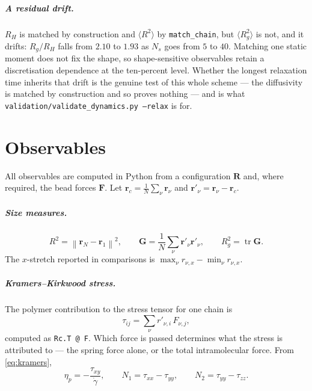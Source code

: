 \documentclass[11pt,a4paper]{report}
\newcommand{\R}{\bm{R}}
\newcommand{\code}[1]{\texttt{\seqsplitcode{#1}}}
\newcommand{\seqsplitcode}[1]{#1}
\begin{document}
\paragraph{A residual drift.} $R_H$ is matched by construction and
$\langle R^{2}\rangle$ by \code{match\_chain}, but $\langle R_g^{2}\rangle$ is
not, and it drifts: $R_g/R_H$ falls from $2.10$ to $1.93$ as $N_s$ goes from $5$
to $40$. Matching one static moment does not fix the shape, so shape-sensitive
observables retain a discretisation dependence at the ten-percent level. Whether
the longest relaxation time inherits that drift is the genuine test of this whole
scheme --- the diffusivity is matched by construction and so proves nothing --- and
is what \code{validation/validate\_dynamics.py --relax} is for.

\chapter{Observables}
\label{ch:observables}

All observables are computed in Python from a configuration $\R$ and, where
required, the bead forces $\bm{F}$. Let $\bm{r}_c = \frac1N\sum_\nu\bm{r}_\nu$ and
$\bm{r}'_\nu = \bm{r}_\nu-\bm{r}_c$.

\paragraph{Size measures.}
\begin{equation}
  R^{2} = \left\|\bm{r}_N-\bm{r}_1\right\|^{2},
  \qquad
  \bm{G} = \frac{1}{N}\sum_\nu \bm{r}'_\nu\bm{r}'_\nu,
  \qquad
  R_g^{2} = \operatorname{tr}\bm{G} .
\end{equation}
The $x$-stretch reported in comparisons is
$\max_\nu r_{\nu,x} - \min_\nu r_{\nu,x}$.

\paragraph{Kramers--Kirkwood stress.} The polymer contribution to the stress
tensor for one chain is
\begin{equation}
  \tau_{ij} = \sum_{\nu} r'_{\nu,i}\,F_{\nu,j},
  \label{eq:kramers}
\end{equation}
computed as \code{Rc.T @ F}. Which force is passed determines what the stress is
attributed to --- the spring force alone, or the total intramolecular force. From
\eqref{eq:kramers},
\begin{equation}
  \eta_p = -\frac{\tau_{xy}}{\dot\gamma},
  \qquad
  N_1 = \tau_{xx}-\tau_{yy},
  \qquad
  N_2 = \tau_{yy}-\tau_{zz}.
\end{equation}
\end{document}
